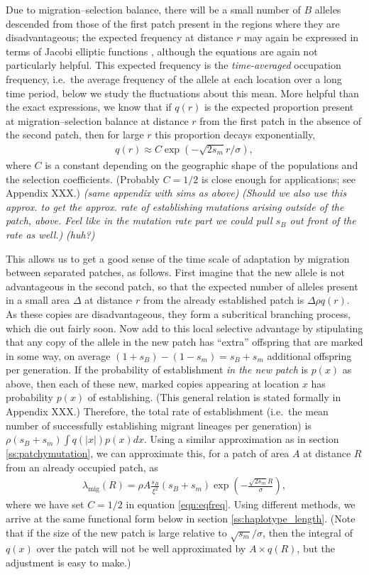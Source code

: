 \documentclass{article}
\newcommand{\migrate}{\lambda_\text{mig}}
\newcommand{\gc}[1]{{\it\color{green}(#1)} }
\newcommand{\plr}[1]{{\it\color{blue}(#1)}}
\begin{document}
Due to migration--selection balance, 
there will be a small number of $B$ alleles descended from those of the first patch
present in the regions where they are disadvantageous;
the expected frequency at distance $r$ may again be expressed in terms of Jacobi elliptic functions \citep[Appendix XXX][]{barton},
although the equations are again not particularly helpful.
This expected frequency is the \emph{time-averaged} occupation frequency,
i.e.\ the average frequency of the allele at each location over a long time period,
below we study the fluctuations about this mean.
More helpful than the exact expressions,
we know that if $q(r)$ is the expected proportion present at migration--selection balance at distance $r$ from the first patch
in the absence of the second patch, 
then for large $r$ this proportion decays exponentially, 
\begin{align} \label{eqn:eqfreq}
  q(r) \approx C \exp( -\sqrt{2 s_m} r / \sigma),
\end{align}
where $C$ is a constant depending on the geographic shape of the populations and the selection coefficients. 
(Probably $C=1/2$ is close enough for applications; see Appendix XXX.)
\plr{same appendix with sims as above}
\gc{Should we also use this approx. to get the approx. rate of establishing mutations
arising outside of the patch, above. Feel like in the mutation rate
part we could pull $s_B$ out front of the rate as well.} 
\plr{huh?}

This allows us to get a good sense of the time scale of adaptation by migration between separated patches, as follows.
First imagine that the new allele is not advantageous in the second patch,
so that the expected number of alleles present in a small area $\Delta$ at distance $r$ from the already established patch
is $\Delta \rho q(r)$.
As these copies are disadvantageous, they form a subcritical branching process, which die out fairly soon.
Now add to this local selective advantage by stipulating that any copy of the allele in the new patch
has ``extra'' offspring that are marked in some way, on average $(1+s_B)-(1-s_m)=s_B+s_m$ additional offspring per generation.
If the probability of establishment \emph{in the new patch} is $p(x)$ as above,
then each of these new, marked copies appearing at location $x$ has probability $p(x)$ of establishing.
(This general relation is stated formally in Appendix XXX.)
Therefore, the total rate of establishment 
(i.e.\ the mean number of successfully establishing migrant lineages per generation)
is $\rho (s_B+s_m) \int q(|x|) p(x) dx$.
Using a similar approximation as in section \ref{ss:patchymutation},
we can approximate this, for a patch of area $A$ at distance $R$ from an already occupied patch, as
\begin{align}
  \migrate(R) = \rho A \frac{s_B}{\xi^2} (s_B+s_m) \exp\left( -\frac{ \sqrt{2 s_m} R}{\sigma} \right),
\end{align}
where we have set $C=1/2$ in equation \eqref{eqn:eqfreq}.
Using different methods, we arrive at the same functional form below in section \ref{ss:haplotype_length}.
(Note that if the size of the new patch is large relative to $\sqrt{s_m}/\sigma$,
then the integral of $q(x)$ over the patch will not be well approximated by $A \times q(R)$,
but the adjustment is easy to make.)
\end{document}
